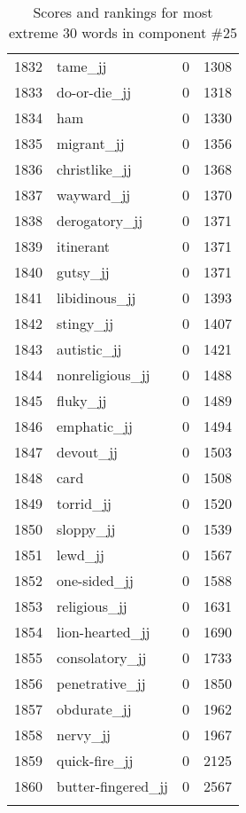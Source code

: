 \begin{longtable}[!htbp]{| rlr@{.}l |}
    1832 & tame\_jj & 0 & 1308 \\
    1833 & do-or-die\_jj & 0 & 1318 \\
    1834 & ham & 0 & 1330 \\
    1835 & migrant\_jj & 0 & 1356 \\
    1836 & christlike\_jj & 0 & 1368 \\
    1837 & wayward\_jj & 0 & 1370 \\
    1838 & derogatory\_jj & 0 & 1371 \\
    1839 & itinerant & 0 & 1371 \\
    1840 & gutsy\_jj & 0 & 1371 \\
    1841 & libidinous\_jj & 0 & 1393 \\
    1842 & stingy\_jj & 0 & 1407 \\
    1843 & autistic\_jj & 0 & 1421 \\
    1844 & nonreligious\_jj & 0 & 1488 \\
    1845 & fluky\_jj & 0 & 1489 \\
    1846 & emphatic\_jj & 0 & 1494 \\
    1847 & devout\_jj & 0 & 1503 \\
    1848 & card & 0 & 1508 \\
    1849 & torrid\_jj & 0 & 1520 \\
    1850 & sloppy\_jj & 0 & 1539 \\
    1851 & lewd\_jj & 0 & 1567 \\
    1852 & one-sided\_jj & 0 & 1588 \\
    1853 & religious\_jj & 0 & 1631 \\
    1854 & lion-hearted\_jj & 0 & 1690 \\
    1855 & consolatory\_jj & 0 & 1733 \\
    1856 & penetrative\_jj & 0 & 1850 \\
    1857 & obdurate\_jj & 0 & 1962 \\
    1858 & nervy\_jj & 0 & 1967 \\
    1859 & quick-fire\_jj & 0 & 2125 \\
    1860 & butter-fingered\_jj & 0 & 2567 \\
    \hline
    \caption{Scores and rankings for most extreme 30 words in component \#25} \\
\end{longtable}
